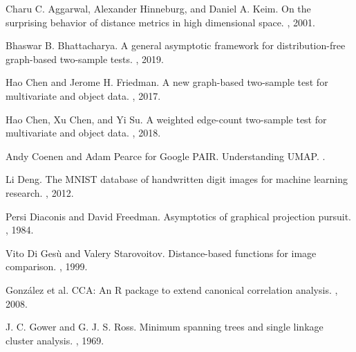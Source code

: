 \documentclass{article}
\begin{document}
\begin{thebibliography}{10}

Charu C. Aggarwal, Alexander Hinneburg, and Daniel A. Keim.
\newblock On the surprising behavior of distance metrics in high dimensional space.
, 2001.

Bhaswar B. Bhattacharya.
\newblock A general asymptotic framework for distribution-free graph-based two-sample tests.
, 2019.

Hao Chen and Jerome H. Friedman.
\newblock A new graph-based two-sample test for multivariate and object data.
, 2017.

Hao Chen, Xu Chen, and Yi Su.
\newblock A weighted edge-count two-sample test for multivariate and object data.
, 2018.

Andy Coenen and Adam Pearce for Google PAIR.
\newblock Understanding UMAP.
.

Li Deng.
\newblock The MNIST database of handwritten digit images for machine learning research.
, 2012.

Persi Diaconis and David Freedman.
\newblock Asymptotics of graphical projection pursuit.
, 1984.

Vito Di Ges\`u and Valery Starovoitov.
\newblock Distance-based functions for image comparison.
, 1999.

Gonz\'alez et al.
\newblock CCA: An R package to extend canonical correlation analysis.
, 2008.

J. C. Gower and G. J. S. Ross.
\newblock Minimum spanning trees and single linkage cluster analysis.
, 1969.


\end{thebibliography}
\end{document}
